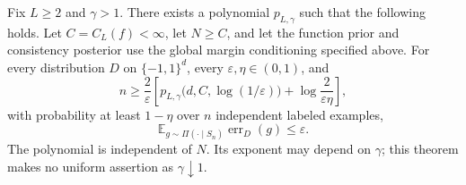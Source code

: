 \begin{theorem}
\label{thm:all-width-gamma-gt-one}
Fix $L\geq2$ and $\gamma>1$. There exists a polynomial $p_{L,\gamma}$ such
that the following holds. Let $C=C_L(f)<\infty$, let $N\geq C$, and let the
function prior and consistency posterior use the global margin conditioning
specified above. For every distribution $D$ on $\{-1,1\}^d$, every
$\varepsilon,\eta\in(0,1)$, and
\[
 n\geq\frac{2}{\varepsilon}\left[
 p_{L,\gamma}\bigl(d,C,\log(1/\varepsilon)\bigr)
 +\log\frac{2}{\varepsilon\eta}\right],
\]
with probability at least $1-\eta$ over $n$ independent labeled examples,
\[
 \mathbb E_{g\sim\Pi(\cdot\mid S_n)}\operatorname{err}_D(g)
 \leq\varepsilon.
\]
The polynomial is independent of $N$. Its exponent may depend on $\gamma$;
this theorem makes no uniform assertion as $\gamma\downarrow1$.
\end{theorem}
